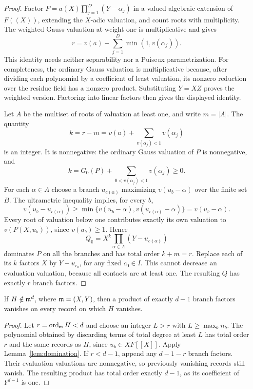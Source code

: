 \begin{proof}
Factor $P=a(X)\prod_{j=1}^D(Y-\alpha_j)$ in a valued algebraic extension of
$F((X))$, extending the $X$-adic valuation, and count roots with multiplicity.
The weighted Gauss valuation at weight one is multiplicative and gives
\[
 r=v(a)+\sum_{j=1}^D\min(1,v(\alpha_j)).
\]
This identity needs neither separability nor a Puiseux parametrization.
For completeness, the ordinary Gauss valuation is multiplicative because,
after dividing each polynomial by a coefficient of least valuation, its
nonzero reduction over the residue field has a nonzero product. Substituting
$Y=XZ$ proves the weighted version. Factoring into linear factors then gives
the displayed identity.

Let $A$ be the multiset of roots of valuation at least one, and write
$m=|A|$. The quantity
\[
 k=r-m=v(a)+\sum_{v(\alpha_j)<1}v(\alpha_j)
\]
is an integer. It is nonnegative: the ordinary Gauss valuation of $P$ is
nonnegative, and
\[
 k=G_0(P)+\sum_{0<v(\alpha_j)<1}v(\alpha_j)\ge0.
\]
For each $\alpha\in A$ choose a branch $u_{c(\alpha)}$ maximizing
$v(u_b-\alpha)$ over the finite set $B$. The ultrametric inequality implies,
for every $b$,
\[
 v(u_b-u_{c(\alpha)})\ge
 \min\{v(u_b-\alpha),v(u_{c(\alpha)}-\alpha)\}
 =v(u_b-\alpha).
\]
Every root of valuation below one contributes exactly its own valuation to
$v(P(X,u_b))$, since $v(u_b)\ge1$. Hence
\[
 Q_0=X^k\prod_{\alpha\in A}(Y-u_{c(\alpha)})
\]
dominates $P$ on all the branches and has total order $k+m=r$.
Replace each of its $k$ factors $X$ by $Y-u_{c_0}$, for any fixed $c_0\in I$.
This cannot decrease an evaluation valuation, because all contacts are at
least one. The resulting $Q$ has exactly $r$ branch factors.
\end{proof}

\begin{corollary}\label{cor:formal}
If $H\notin\mathfrak m^d$, where $\mathfrak m=(X,Y)$, then a product of exactly $d-1$ branch
factors vanishes on every record on which $H$ vanishes.
\end{corollary}

\begin{proof}
Let $r=\operatorname{ord}_\mathfrak m H<d$ and choose an integer $L>r$ with
$L\ge\max_b n_b$. The polynomial obtained by discarding terms of total degree
at least $L$ has total order $r$ and the same records as $H$, since
$u_b\in XF[[X]]$. Apply Lemma~\ref{lem:domination}. If $r<d-1$, append any
$d-1-r$ branch factors. Their evaluation valuations are nonnegative, so
previously vanishing records still vanish. The resulting product has total
order exactly $d-1$, as its coefficient of $Y^{d-1}$ is one.
\end{proof}

